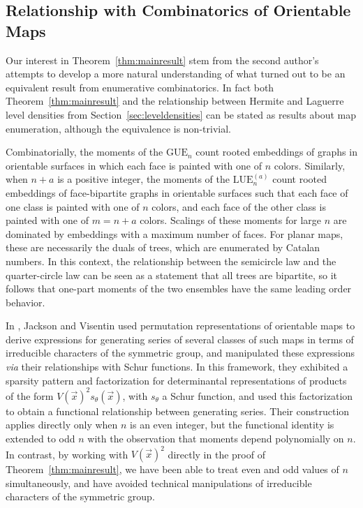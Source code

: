 \documentclass[pdftex, oneside, 10pt, letterpaper]{amsart}
\theoremstyle{plain}
\theoremstyle{definition}
\theoremstyle{remark}
\begin{document}
\subsection{Relationship with Combinatorics of Orientable Maps}\label{sec:maps}

Our interest in Theorem~\ref{thm:mainresult} stem from the second
author's attempts to develop a more natural understanding of what
turned out to be an equivalent result from enumerative combinatorics.
In fact both Theorem~\ref{thm:mainresult} and the relationship between
Hermite and Laguerre level densities from
Section~\ref{sec:leveldensities} can be stated as results about map
enumeration, although the equivalence is non-trivial.

Combinatorially, the moments of the ${\ensuremath{\mathrm{GUE}}}{}_n$ count rooted embeddings
of graphs in orientable surfaces in which each face is painted with
one of $n$ colors.  Similarly, when $n+a$ is a positive integer, the
moments of the ${\ensuremath{\mathrm{LUE}}}{}_n^{(a)}$ count rooted embeddings of
face-bipartite graphs in orientable surfaces such that each face of
one class is painted with one of $n$ colors, and each face of the
other class is painted with one of $m=n+a$ colors.  Scalings of these
moments for large $n$ are dominated by embeddings with a maximum
number of faces.  For planar maps, these are necessarily the duals of
trees, which are enumerated by Catalan numbers.  In this context, the
relationship between the semicircle law and the quarter-circle law can
be seen as a statement that all trees are bipartite, so it follows
that one-part moments of the two ensembles have the same leading order
behavior.

In \cite{JV-Characters}, Jackson and Visentin used permutation
representations of orientable maps to derive expressions for
generating series of several classes of such maps in terms of
irreducible characters of the symmetric group, and manipulated these
expressions \emph{via} their relationships with Schur functions.  In
this framework, they exhibited a sparsity pattern and factorization
for determinantal representations of products of the form
$V(\vec{x})^2s_{\theta}(\vec{x})$, with $s_\theta$ a Schur function,
and used this factorization to obtain a functional relationship
between generating series.  Their construction applies directly only
when $n$ is an even integer, but the functional identity is extended
to odd $n$ with the observation that moments depend polynomially on
$n$.  In contrast, by working with $V(\vec{x})^2$ directly in the
proof of Theorem~\ref{thm:mainresult}, we have been able to treat even
and odd values of $n$ simultaneously, and have avoided technical
manipulations of irreducible characters of the symmetric group.
\end{document}
